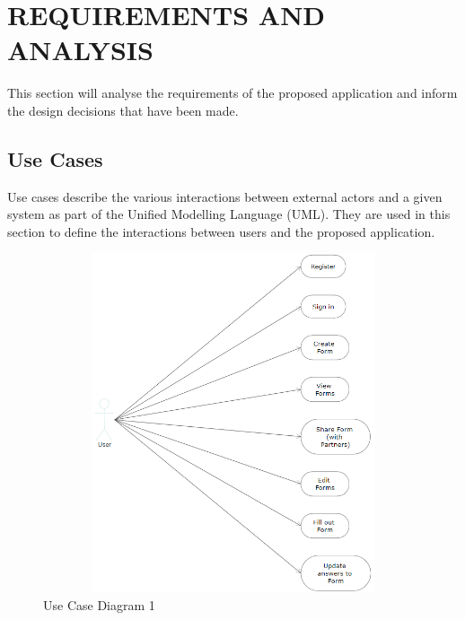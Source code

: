\chapter{REQUIREMENTS AND ANALYSIS}

This section will analyse the requirements of the proposed application and inform the design decisions that have been made.

\section{Use Cases}
    Use cases describe the various interactions between external actors and a given system as part of the Unified Modelling Language (UML). They are used in this section to define the interactions between users and the proposed application.

    \begin{figure}
        \center
        \includegraphics[height=100mm, width=150mm]{../figures/UseCaseUser}
        \caption{Use Case Diagram 1}
    \end{figure}

